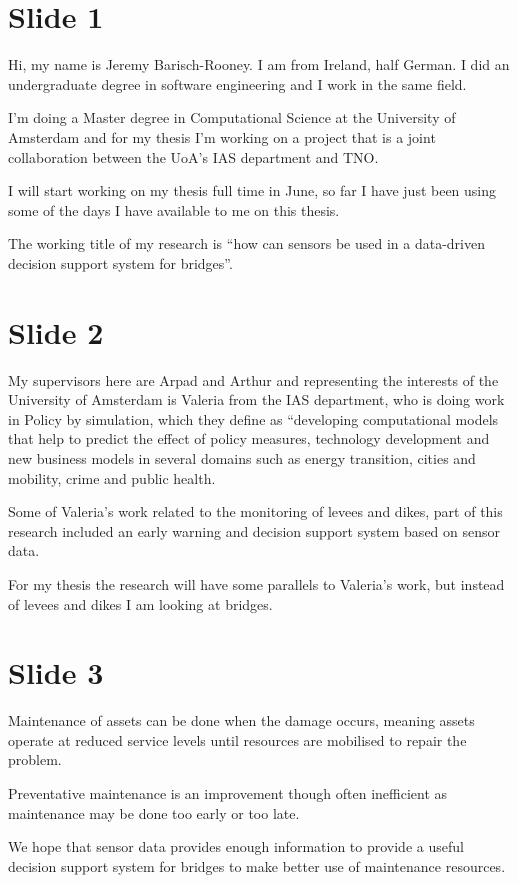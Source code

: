 \documentclass[11pt]{article}
\author{Jeremy}
\date{\today}
\title{}
\begin{document}
\section{Slide 1}
\label{sec:org33ac4e2}
Hi, my name is Jeremy Barisch-Rooney. I am from Ireland, half German. I did an
undergraduate degree in software engineering and I work in the same field.

I’m doing a Master degree in Computational Science at the University of
Amsterdam and for my thesis I’m working on a project that is a joint
collaboration between the UoA’s IAS department and TNO.

I will start working on my thesis full time in June, so far I have just been
using some of the days I have available to me on this thesis.

The working title of my research is “how can sensors be used in a data-driven
decision support system for bridges”.
\section{Slide 2}
\label{sec:orgacab840}
My supervisors here are Arpad and Arthur and representing the interests of the
University of Amsterdam is Valeria from the IAS department, who is doing work
in Policy by simulation, which they define as “developing computational models
that help to predict the effect of policy measures, technology development and
new business models in several domains such as energy transition, cities and
mobility, crime and public health.

Some of Valeria’s work related to the monitoring of levees and dikes, part of
this research included an early warning and decision support system based on
sensor data.

For my thesis the research will have some parallels to Valeria’s work, but
instead of levees and dikes I am looking at bridges.
\section{Slide 3}
\label{sec:org14fda84}
Maintenance of assets can be done when the damage occurs, meaning assets
operate at reduced service levels until resources are mobilised to repair the
problem.

Preventative maintenance is an improvement though often inefficient as
maintenance may be done too early or too late.

We hope that sensor data provides enough information to provide a useful
decision support system for bridges to make better use of maintenance
resources.
\end{document}

